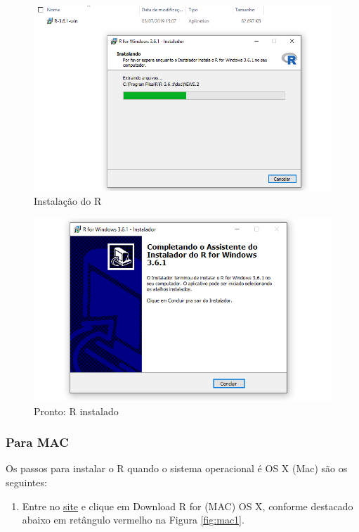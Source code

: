 \documentclass[
]{book}
\providecommand{\tightlist}{%
  \setlength{\itemsep}{0pt}\setlength{\parskip}{0pt}}
\begin{document}
\begin{figure}
\includegraphics[width=1\linewidth]{figures/install_Windows10} \caption{\label{fig:windows10}Instalação do R}\label{fig:windows10}
\end{figure}

\begin{figure}
\includegraphics[width=1\linewidth]{figures/install_Windows11} \caption{\label{fig:windows11}Pronto: R instalado}\label{fig:windows11}
\end{figure}

\hypertarget{para-mac}{%
\subsubsection{Para MAC}\label{para-mac}}

Os passos para instalar o R quando o sistema operacional é OS X (Mac) são os seguintes:

\begin{enumerate}
\def\labelenumi{\arabic{enumi})}
\tightlist
\item
  Entre no \href{https://cran.r-project.org}{site} e clique em Download R for (MAC) OS X, conforme destacado abaixo em retângulo vermelho na Figura \ref{fig:mac1}.
\end{enumerate}
\end{document}
